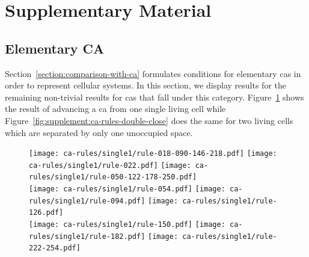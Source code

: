 


\section{Supplementary Material}
\subsection{Elementary CA}
Section~\ref{section:comparison-with-ca} formulates conditions for elementary \acp{ca} in order to
represent cellular systems.
In this section, we display results for the remaining non-trivial results for \acp{ca} that fall
under this category.
Figure~\ref{fig:supplement:ca-rules-single} shows the result of advancing a \ac{ca} from one single
living cell while Figure~\ref{fig:supplement:ca-rules-double-close} does the same for two living
cells which are separated by only one unoccupied space.

\begin{figure}[h]
    \centering
    \texttt{[image: ca-rules/single1/rule-018-090-146-218.pdf]}%
    \hspace{0.01\textwidth}%
    \texttt{[image: ca-rules/single1/rule-022.pdf]}\hspace{0.01\textwidth}%
    \texttt{[image: ca-rules/single1/rule-050-122-178-250.pdf]}\\
    \vspace{0.01\textwidth}%
    \texttt{[image: ca-rules/single1/rule-054.pdf]}\hspace{0.01\textwidth}%
    \texttt{[image: ca-rules/single1/rule-094.pdf]}\hspace{0.01\textwidth}%
    \texttt{[image: ca-rules/single1/rule-126.pdf]}\\
    \vspace{0.01\textwidth}
    \texttt{[image: ca-rules/single1/rule-150.pdf]}\hspace{0.01\textwidth}%
    \texttt{[image: ca-rules/single1/rule-182.pdf]}\hspace{0.01\textwidth}%
    \texttt{[image: ca-rules/single1/rule-222-254.pdf]}%
    \hspace{0.01\textwidth}%
    \caption{}
    \label{fig:supplement:ca-rules-single}
\end{figure}

